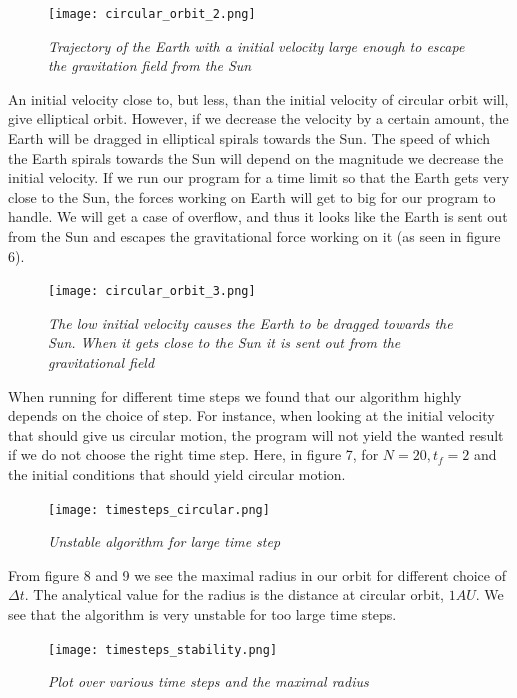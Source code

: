\documentclass[a4paper,12pt, english]{article}
\begin{document}
\begin{figure}[h!]
  \centering
    \texttt{[image: circular\_orbit\_2.png]}
  \caption{\textit{Trajectory of the Earth with a initial velocity large enough to escape the gravitation field from the Sun}}
\end{figure}


An initial velocity close to, but less, than the initial velocity of circular orbit will, give elliptical orbit. However, if we decrease the velocity by a certain amount, the Earth will be dragged in elliptical spirals towards the Sun. The speed of which the Earth spirals towards the Sun will depend on the magnitude we decrease the initial velocity. If we run our program for a time limit so that the Earth gets very close to the Sun, the forces working on Earth will get to big for our program to handle. We will get a case of overflow, and thus it looks like the Earth is sent out from the Sun and escapes the gravitational force working on it (as seen in figure 6).   
     
\begin{figure}[h!]
  \centering
    \texttt{[image: circular\_orbit\_3.png]}
  \caption{\textit{The low initial velocity causes the Earth to be dragged towards the Sun. When it gets close to the Sun it is sent out from the gravitational field}}
\end{figure}


When running for different time steps we found that our algorithm highly depends on the choice of step. For instance, when looking at the initial velocity that should give us circular motion, the program will not yield the wanted result if we do not choose the right time step. Here, in figure 7, for $N = 20, t_f = 2$ and the initial conditions that should yield circular motion.
  
\begin{figure}[h!]
  \centering
   	 \texttt{[image: timesteps\_circular.png]}
  \caption{\textit{Unstable algorithm for large time step}}
\end{figure}

From figure 8 and 9 we see the maximal radius in our orbit for different choice of $\Delta t$. The analytical value for the radius is the distance at circular orbit, $1 AU$. We see that the algorithm is very unstable for too large time steps.

\begin{figure}[h!]
  \centering
   	 \texttt{[image: timesteps\_stability.png]}
  \caption{\textit{Plot over various time steps and the maximal radius}}
\end{figure}
 
\end{document}
